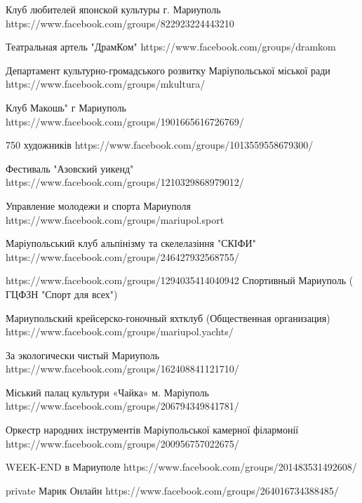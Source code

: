  
 
 
 
 

Клуб любителей японской культуры г. Мариуполь
https://www.facebook.com/groups/822923224443210

Театральная артель "ДрамКом"
https://www.facebook.com/groups/dramkom

Департамент культурно-громадського розвитку Маріупольської міської ради
https://www.facebook.com/groups/mkultura/

Клуб Макошь" г Мариуполь
https://www.facebook.com/groups/1901665616726769/

750 художників
https://www.facebook.com/groups/1013559558679300/

Фестиваль "Азовский уикенд"
https://www.facebook.com/groups/1210329868979012/

Управление молодежи и спорта Мариуполя
https://www.facebook.com/groups/mariupol.sport

Маріупольський клуб альпінізму та скелелазіння "СКІФИ"
https://www.facebook.com/groups/246427932568755/

https://www.facebook.com/groups/1294035414040942
Спортивный Мариуполь ( ГЦФЗН "Спорт для всех")

Мариупольский крейсерско-гоночный яхтклуб (Общественная организация)
https://www.facebook.com/groups/mariupol.yachts/

За экологически чистый Мариуполь
https://www.facebook.com/groups/162408841121710/

Міський палац культури «Чайка» м. Маріуполь
https://www.facebook.com/groups/206794349841781/

Оркестр народних інструментів Маріупольської камерної філармонії
https://www.facebook.com/groups/200956757022675/

WEEK-END в Мариуполе
https://www.facebook.com/groups/201483531492608/

private
Марик Онлайн
https://www.facebook.com/groups/264016734388485/
